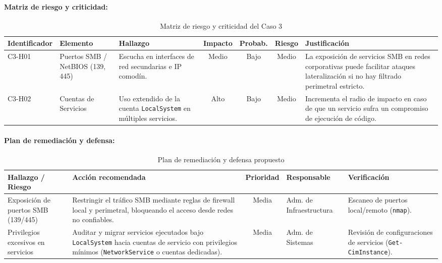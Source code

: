 \paragraph{Matriz de riesgo y criticidad:}

\begin{table}[H]
\centering
\scriptsize
\setlength{\tabcolsep}{3pt}
\caption{Matriz de riesgo y criticidad del Caso 3}
\label{tab:matriz_riesgo}
\begin{tabular}{|p{2cm}|p{2.5cm}|p{3cm}|c|c|c|p{3.5cm}|}
\hline
\textbf{Identificador} & \textbf{Elemento} & \textbf{Hallazgo} & \textbf{Impacto} & \textbf{Probab.} & \textbf{Riesgo} & \textbf{Justificación} \\
\hline
C3-H01 & Puertos SMB / NetBIOS (139, 445) & Escucha en interfaces de red secundarias e IP comodín. & Medio & Bajo & Medio & La exposición de servicios SMB en redes corporativas puede facilitar ataques lateralización si no hay filtrado perimetral estricto. \\
\hline
C3-H02 & Cuentas de Servicios & Uso extendido de la cuenta \texttt{LocalSystem} en múltiples servicios. & Alto & Bajo & Medio & Incrementa el radio de impacto en caso de que un servicio sufra un compromiso de ejecución de código. \\
\hline
\end{tabular}
\end{table}

\paragraph{Plan de remediación y defensa:}

\begin{table}[H]
\centering
\footnotesize
\caption{Plan de remediación y defensa propuesto}
\label{tab:remediacion}
\begin{tabular}{|p{3cm}|p{4cm}|c|p{2.5cm}|p{3cm}|}
\hline
\textbf{Hallazgo / Riesgo} & \textbf{Acción recomendada} & \textbf{Prioridad} & \textbf{Responsable} & \textbf{Verificación} \\
\hline
Exposición de puertos SMB (139/445) & Restringir el tráfico SMB mediante reglas de firewall local y perimetral, bloqueando el acceso desde redes no confiables. & Media & Adm. de Infraestructura & Escaneo de puertos local/remoto (\texttt{nmap}). \\
\hline
Privilegios excesivos en servicios & Auditar y migrar servicios ejecutados bajo \texttt{LocalSystem} hacia cuentas de servicio con privilegios mínimos (\texttt{NetworkService} o cuentas dedicadas). & Media & Adm. de Sistemas & Revisión de configuraciones de servicios (\texttt{Get-CimInstance}). \\
\hline
\end{tabular}
\end{table}

